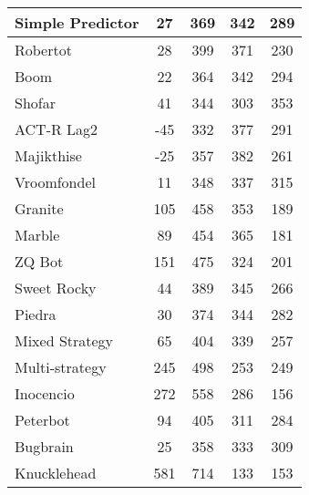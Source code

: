 \begin{table*}
\begin{tabular}{|l|c|c|c|c|}
Simple Predictor & 27 & 369 & 342 & 289 \\ \hline 
Robertot & 28 & 399 & 371 & 230 \\ \hline 
Boom & 22 & 364 & 342 & 294 \\ \hline 
Shofar & 41 & 344 & 303 & 353 \\ \hline 
ACT-R Lag2 & -45 & 332 & 377 & 291 \\ \hline 
Majikthise & -25 & 357 & 382 & 261 \\ \hline 
Vroomfondel & 11 & 348 & 337 & 315 \\ \hline 
Granite & 105 & 458 & 353 & 189 \\ \hline 
Marble & 89 & 454 & 365 & 181 \\ \hline 
ZQ Bot & 151 & 475 & 324 & 201 \\ \hline 
Sweet Rocky & 44 & 389 & 345 & 266 \\ \hline 
Piedra & 30 & 374 & 344 & 282 \\ \hline 
Mixed Strategy & 65 & 404 & 339 & 257 \\ \hline 
Multi-strategy & 245 & 498 & 253 & 249 \\ \hline 
Inocencio & 272 & 558 & 286 & 156 \\ \hline 
Peterbot & 94 & 405 & 311 & 284 \\ \hline 
Bugbrain & 25 & 358 & 333 & 309 \\ \hline 
Knucklehead & 581 & 714 & 133 & 153 \\ \hline
        \end{tabular}
    \end{table*}